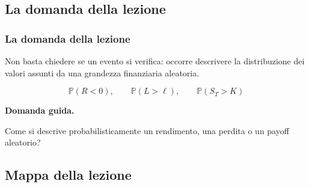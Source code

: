 \documentclass[handout]{beamer}%
\providecommand{\Prob}{\mathbb{P}}
\providecommand{\1}{\mathbf{1}}
\providecommand{\QTR}[2]{\csname #1\endcsname{#2}}
\begin{document}


\subsection{La domanda della lezione}%

\begin{frame}%
%

\frametitle{La domanda della lezione}%


Non basta chiedere se un evento si verifica: occorre descrivere la
distribuzione dei valori assunti da una grandezza finanziaria aleatoria.%

\[
\Prob(R<0), \qquad\Prob(L>\ell), \qquad\Prob(S_{T}>K)
\]


\medskip

\textbf{Domanda guida.}

\medskip

Come si descrive probabilisticamente un rendimento, una perdita o un payoff aleatorio?%

\transboxout
\end{frame}%




\subsection{Mappa della lezione}%
\end{document}
